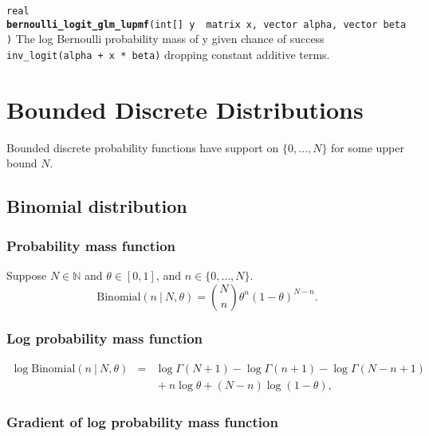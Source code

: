 \documentclass[
  10pt,
]{book}
\begin{document}

\texttt{real} \textbf{\texttt{bernoulli\_logit\_glm\_lupmf}}\texttt{(int{[}{]}\ y\ \textbar{}\ matrix\ x,\ vector\ alpha,\ vector\ beta)}\newline
The log Bernoulli probability mass of y given chance of success
\texttt{inv\_logit(alpha\ +\ x\ *\ beta)} dropping constant additive terms.

\hypertarget{bounded-discrete-distributions}{%
\chapter{Bounded Discrete Distributions}\label{bounded-discrete-distributions}}

Bounded discrete probability functions have support on \(\{ 0, \ldots, N \}\) for some upper bound \(N\).

\hypertarget{binomial-distribution}{%
\section{Binomial distribution}\label{binomial-distribution}}

\hypertarget{probability-mass-function-3}{%
\subsection{Probability mass function}\label{probability-mass-function-3}}

Suppose \(N \in \mathbb{N}\) and \(\theta \in [0,1]\), and \(n \in \{0,\ldots,N\}\). \[ \text{Binomial}(n~|~N,\theta) = \binom{N}{n}
\theta^n (1 - \theta)^{N - n}. \]

\hypertarget{log-probability-mass-function}{%
\subsection{Log probability mass function}\label{log-probability-mass-function}}

\begin{eqnarray*} \log \text{Binomial}(n~|~N,\theta) & = & \log
\Gamma(N+1) - \log \Gamma(n + 1) - \log \Gamma(N- n + 1) \\[4pt] & & {
} + n \log \theta + (N - n) \log (1 - \theta), \end{eqnarray*}

\hypertarget{gradient-of-log-probability-mass-function}{%
\subsection{Gradient of log probability mass function}\label{gradient-of-log-probability-mass-function}}
\end{document}
